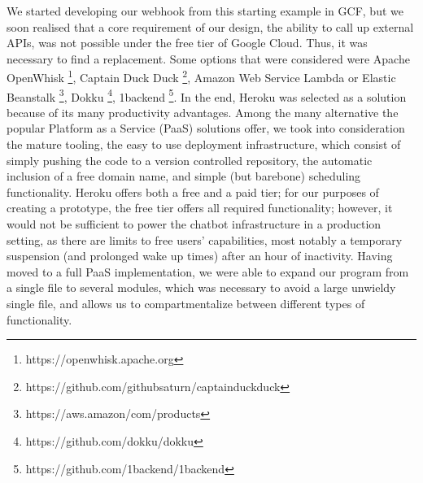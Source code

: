 We started developing our webhook from this starting example in GCF, but we soon realised that a core requirement of our design, the ability to call up external APIs, was not possible under the free tier of Google Cloud. Thus, it was necessary to find a replacement. Some options that were considered were Apache OpenWhisk \footnote{https://openwhisk.apache.org}, Captain Duck Duck \footnote{https://github.com/githubsaturn/captainduckduck}, Amazon Web Service Lambda or Elastic Beanstalk \footnote{https://aws.amazon/com/products}, Dokku \footnote{https://github.com/dokku/dokku}, 1backend \footnote{https://github.com/1backend/1backend}. In the end, Heroku was selected as a solution because of its many productivity advantages. Among the many alternative the popular Platform as a Service (PaaS) solutions offer, we took into consideration the mature tooling, the easy to use deployment infrastructure, which consist of simply pushing the code to a version controlled repository, the automatic inclusion of a free domain name, and simple (but barebone) scheduling functionality. Heroku offers both a free and a paid tier; for our purposes of creating a prototype, the free tier offers all required functionality; however, it would not be sufficient to power the chatbot infrastructure in a production setting, as there are limits to free users' capabilities, most notably a temporary suspension (and prolonged wake up times) after an hour of inactivity.
Having moved to a full PaaS implementation, we were able to expand our program from a single file to several modules, which was necessary to avoid a large unwieldy single file, and allows us to compartmentalize between different types of functionality.
